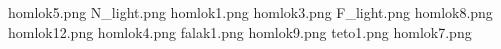 homlok5.png
N_light.png
homlok1.png
homlok3.png
F_light.png
homlok8.png
homlok12.png
homlok4.png
falak1.png
homlok9.png
teto1.png
homlok7.png
